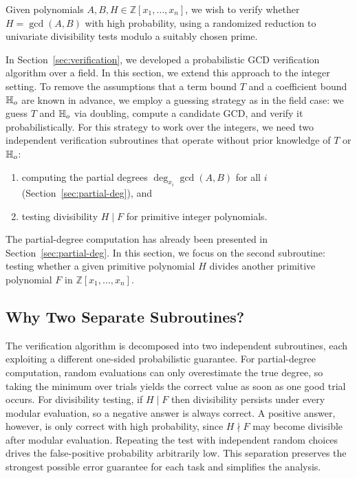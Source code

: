 \documentclass{article}
\numberwithin{equation}{section}
\begin{document}
Given polynomials $A, B, H \in \mathbb{Z}[x_1,\dots,x_n]$, we wish to verify whether $H = \gcd(A,B)$ with high probability, using a randomized reduction to univariate divisibility tests modulo a suitably chosen prime.

In Section~\ref{sec:verification}, we developed a probabilistic GCD verification algorithm over a field. In this section, we extend this approach to the integer setting. To remove the assumptions that a term bound $T$ and a coefficient bound $\mathbb{H}_{o}$ are known in advance, we employ a guessing strategy as in the field case: we guess $T$ and $\mathbb{H}_{o}$ via doubling, compute a candidate GCD, and verify it probabilistically. For this strategy to work over the integers, we need two independent verification subroutines that operate without prior knowledge of $T$ or $\mathbb{H}_{o}$:

\begin{enumerate}
    \item computing the partial degrees $\deg_{x_i} \gcd(A,B)$ for all $i$ (Section~\ref{sec:partial-deg}), and
    \item testing divisibility $H \mid F$ for primitive integer polynomials.
\end{enumerate}

The partial-degree computation has already been presented in Section~\ref{sec:partial-deg}. In this section, we focus on the second subroutine: testing whether a given primitive polynomial $H$ divides another primitive polynomial $F$ in $\mathbb{Z}[x_1,\dots,x_n]$.


\subsection*{Why Two Separate Subroutines?}

The verification algorithm is decomposed into two independent subroutines, each exploiting a different one-sided probabilistic guarantee. For partial-degree computation, random evaluations can only overestimate the true degree, so taking the minimum over trials yields the correct value as soon as one good trial occurs. For divisibility testing, if $H \mid F$ then divisibility persists under every modular evaluation, so a negative answer is always correct. A positive answer, however, is only correct with high probability, since $H \nmid F$ may become divisible after modular evaluation. Repeating the test with independent random choices drives the false-positive probability arbitrarily low.
%
This separation preserves the strongest possible error guarantee for each task and simplifies the analysis.
\end{document}
